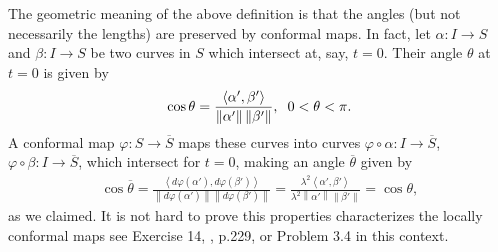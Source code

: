 \documentclass[a4paper]{article}
\numberwithin{equation}{section}
\begin{document}
The geometric meaning of the above definition is that the angles (but not necessarily the lengths) are preserved by conformal maps. In fact, let $\alpha :I\to S$ and $\beta :I\to S$ be two curves in $S$ which intersect at, say, $t=0$. Their angle $\theta$ at $t=0$ is given by
\begin{align}
\cos \theta  = \frac{{\left\langle {\alpha ',\beta '} \right\rangle }}{{\left\| {\alpha '} \right\|\left\| {\beta '} \right\|}},\hspace{0.2cm}0 < \theta  < \pi .
\end{align}
A conformal map $\varphi :S\to \overline{S}$ maps these curves into curves $\varphi  \circ \alpha :I \to \overline S $, $\varphi  \circ \beta :I \to \overline S $, which intersect for $t=0$, making an angle $\overline{\theta}$ given by
\begin{align}
\cos \overline \theta   = \frac{{\left\langle {d\varphi \left( {\alpha '} \right),d\varphi \left( {\beta '} \right)} \right\rangle }}{{\left\| {d\varphi \left( {\alpha '} \right)} \right\|\left\| {d\varphi \left( {\beta '} \right)} \right\|}} = \frac{{{\lambda ^2}\left\langle {\alpha ',\beta '} \right\rangle }}{{{\lambda ^2}\left\| {\alpha '} \right\|\left\| {\beta '} \right\|}} = \cos \theta ,
\end{align}
as we claimed. It is not hard to prove this properties characterizes the locally conformal maps see Exercise 14, \cite{2}, p.229, or Problem 3.4 in this context.
\end{document}
